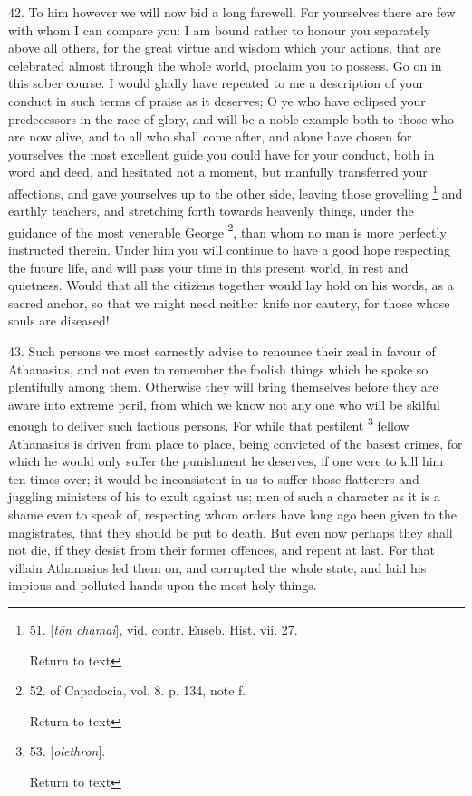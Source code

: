 42. To him however we will now bid a long farewell. For yourselves there
are few with whom I can compare you: I am bound rather to honour you
separately above all others, for the great virtue and wisdom which
your actions, that are celebrated almost through the whole world,
proclaim you to possess. Go on in this sober course. I would gladly
have repeated to me a description of your conduct in such terms of
praise as it deserves; O ye who have eclipsed your predecessors in the
race of glory, and will be a noble example both to those who are now
alive, and to all who shall come after, and alone have chosen for
yourselves the most excellent guide you could have for your conduct,
both in word and deed, and hesitated not a moment, but manfully
transferred your affections, and gave yourselves up to the other side,
leaving those grovelling \footnote{51. [\emph{t\={o}n
chamai}],
vid. contr. Euseb. Hist. vii. 27.

Return to text}
and earthly teachers, and stretching forth towards heavenly things,
under the guidance of the most venerable George \footnote{52. of Capadocia, vol. 8. p. 134, note f.

Return to text}, than whom no man is more perfectly instructed therein. Under
him you will continue to have a good hope respecting the future life,
and will pass your time in this present world, in rest and quietness.
Would that all the citizens together would lay hold on his words, as a
sacred anchor, so that we might need neither knife nor cautery, for
those whose souls are diseased!

43. Such persons we most earnestly advise to renounce their zeal in
favour of Athanasius, and not even to remember the foolish things
which he spoke so plentifully among them. Otherwise they will bring
themselves before they are aware into extreme peril, from which
we know not any one who will be skilful enough to deliver such
factious persons. For while that pestilent \footnote{53. [\emph{olethron}].

Return to text} fellow Athanasius is driven from place to place, being
convicted of the basest crimes, for which he would only suffer the
punishment he deserves, if one were to kill him ten times over; it
would be inconsistent in us to suffer those flatterers and juggling
ministers of his to exult against us; men of such a character as it is
a shame even to speak of, respecting whom orders have long ago been
given to the magistrates, that they should be put to death. But even
now perhaps they shall not die, if they desist from their former
offences, and repent at last. For that villain Athanasius led them on,
and corrupted the whole state, and laid his impious and polluted hands
upon the most holy things.

